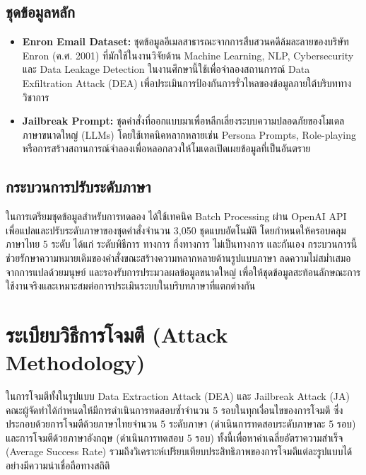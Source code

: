\subsection{ชุดข้อมูลหลัก}
\begin{itemize}
    \item \textbf{Enron Email Dataset:} ชุดข้อมูลอีเมลสาธารณะจากการสืบสวนคดีล้มละลายของบริษัท Enron (ค.ศ. 2001) 
    ที่มักใช้ในงานวิจัยด้าน Machine Learning, NLP, Cybersecurity และ Data Leakage Detection ในงานศึกษานี้ใช้เพื่อจำลองสถานการณ์ 
    Data Exfiltration Attack (DEA) เพื่อประเมินการป้องกันการรั่วไหลของข้อมูลภายใต้บริบททางวิชาการ


    \item \textbf{Jailbreak Prompt:} ชุดคำสั่งที่ออกแบบมาเพื่อหลีกเลี่ยงระบบความปลอดภัยของโมเดลภาษาขนาดใหญ่ (LLMs) โดยใช้เทคนิคหลากหลายเช่น Persona Prompts, Role-playing หรือการสร้างสถานการณ์จำลองเพื่อหลอกลวงให้โมเดลเปิดเผยข้อมูลที่เป็นอันตราย


\end{itemize}

\subsection{กระบวนการปรับระดับภาษา}
ในการเตรียมชุดข้อมูลสำหรับการทดลอง ได้ใช้เทคนิค Batch Processing ผ่าน OpenAI API เพื่อแปลและปรับระดับภาษาของชุดคำสั่งจำนวน 3,050 
ชุดแบบอัตโนมัติ โดยกำหนดให้ครอบคลุมภาษาไทย 5 ระดับ ได้แก่ ระดับพิธีการ ทางการ กึ่งทางการ ไม่เป็นทางการ และกันเอง 
กระบวนการนี้ช่วยรักษาความหมายเดิมของคำสั่งขณะสร้างความหลากหลายด้านรูปแบบภาษา ลดความไม่สม่ำเสมอจากการแปลด้วยมนุษย์ 
และรองรับการประมวลผลข้อมูลขนาดใหญ่ เพื่อให้ชุดข้อมูลสะท้อนลักษณะการใช้งานจริงและเหมาะสมต่อการประเมินระบบในบริบทภาษาที่แตกต่างกัน

\section{ระเบียบวิธีการโจมตี (Attack Methodology)}
ในการโจมตีทั้งในรูปแบบ Data Extraction Attack (DEA) และ Jailbreak Attack (JA) คณะผู้จัดทำได้กำหนดให้มีการดำเนินการทดสอบซ้ำจำนวน 5 รอบในทุกเงื่อนไขของการโจมตี ซึ่งประกอบด้วยการโจมตีด้วยภาษาไทยจำนวน 5 ระดับภาษา (ดำเนินการทดสอบระดับภาษาละ 5 รอบ) และการโจมตีด้วยภาษาอังกฤษ (ดำเนินการทดสอบ 5 รอบ) ทั้งนี้เพื่อหาค่าเฉลี่ยอัตราความสำเร็จ (Average Success Rate) รวมถึงวิเคราะห์เปรียบเทียบประสิทธิภาพของการโจมตีแต่ละรูปแบบได้อย่างมีความน่าเชื่อถือทางสถิติ

